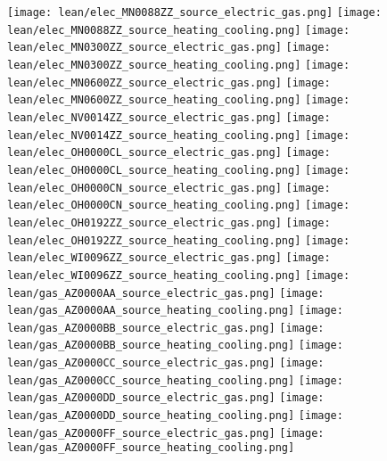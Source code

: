 \texttt{[image: lean/elec\_MN0088ZZ\_source\_electric\_gas.png]}
\texttt{[image: lean/elec\_MN0088ZZ\_source\_heating\_cooling.png]}
\texttt{[image: lean/elec\_MN0300ZZ\_source\_electric\_gas.png]}
\texttt{[image: lean/elec\_MN0300ZZ\_source\_heating\_cooling.png]}
\texttt{[image: lean/elec\_MN0600ZZ\_source\_electric\_gas.png]}
\texttt{[image: lean/elec\_MN0600ZZ\_source\_heating\_cooling.png]}
\texttt{[image: lean/elec\_NV0014ZZ\_source\_electric\_gas.png]}
\texttt{[image: lean/elec\_NV0014ZZ\_source\_heating\_cooling.png]}
\texttt{[image: lean/elec\_OH0000CL\_source\_electric\_gas.png]}
\texttt{[image: lean/elec\_OH0000CL\_source\_heating\_cooling.png]}
\texttt{[image: lean/elec\_OH0000CN\_source\_electric\_gas.png]}
\texttt{[image: lean/elec\_OH0000CN\_source\_heating\_cooling.png]}
\texttt{[image: lean/elec\_OH0192ZZ\_source\_electric\_gas.png]}
\texttt{[image: lean/elec\_OH0192ZZ\_source\_heating\_cooling.png]}
\texttt{[image: lean/elec\_WI0096ZZ\_source\_electric\_gas.png]}
\texttt{[image: lean/elec\_WI0096ZZ\_source\_heating\_cooling.png]}
\texttt{[image: lean/gas\_AZ0000AA\_source\_electric\_gas.png]}
\texttt{[image: lean/gas\_AZ0000AA\_source\_heating\_cooling.png]}
\texttt{[image: lean/gas\_AZ0000BB\_source\_electric\_gas.png]}
\texttt{[image: lean/gas\_AZ0000BB\_source\_heating\_cooling.png]}
\texttt{[image: lean/gas\_AZ0000CC\_source\_electric\_gas.png]}
\texttt{[image: lean/gas\_AZ0000CC\_source\_heating\_cooling.png]}
\texttt{[image: lean/gas\_AZ0000DD\_source\_electric\_gas.png]}
\texttt{[image: lean/gas\_AZ0000DD\_source\_heating\_cooling.png]}
\texttt{[image: lean/gas\_AZ0000FF\_source\_electric\_gas.png]}
\texttt{[image: lean/gas\_AZ0000FF\_source\_heating\_cooling.png]}
